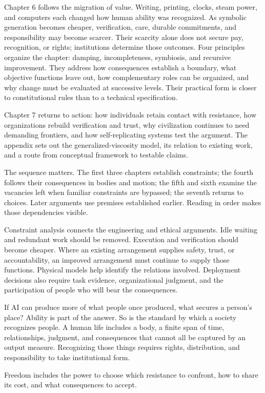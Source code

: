 Chapter 6 follows the migration of value. Writing, printing, clocks, steam power, and computers each changed how human ability was recognized. As symbolic generation becomes cheaper, verification, care, durable commitments, and responsibility may become scarcer. Their scarcity alone does not secure pay, recognition, or rights; institutions determine those outcomes. Four principles organize the chapter: damping, incompleteness, symbiosis, and recursive improvement. They address how consequences establish a boundary, what objective functions leave out, how complementary roles can be organized, and why change must be evaluated at successive levels. Their practical form is closer to constitutional rules than to a technical specification.

Chapter 7 returns to action: how individuals retain contact with resistance, how organizations rebuild verification and trust, why civilization continues to need demanding frontiers, and how self-replicating systems test the argument. The appendix sets out the generalized-viscosity model, its relation to existing work, and a route from conceptual framework to testable claims.

The sequence matters. The first three chapters establish constraints; the fourth follows their consequences in bodies and motion; the fifth and sixth examine the vacancies left when familiar constraints are bypassed; the seventh returns to choices. Later arguments use premises established earlier. Reading in order makes those dependencies visible.

Constraint analysis connects the engineering and ethical arguments. Idle waiting and redundant work should be removed. Execution and verification should become cheaper. Where an existing arrangement supplies safety, trust, or accountability, an improved arrangement must continue to supply those functions. Physical models help identify the relations involved. Deployment decisions also require task evidence, organizational judgment, and the participation of people who will bear the consequences.

If AI can produce more of what people once produced, what secures a person's place? Ability is part of the answer. So is the standard by which a society recognizes people. A human life includes a body, a finite span of time, relationships, judgment, and consequences that cannot all be captured by an output measure. Recognizing those things requires rights, distribution, and responsibility to take institutional form.

Freedom includes the power to choose which resistance to confront, how to share its cost, and what consequences to accept.
